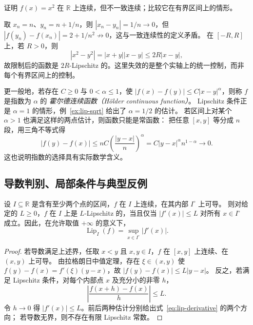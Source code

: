 \documentclass[UTF8,12pt,a4paper,fontset=fandol]{ctexart}
\begin{document}
\begin{example}\label{ex:lip-square-global}
证明 $f(x)=x^2$ 在 $\mathbb R$ 上连续，但不一致连续；比较它在有界区间上的情形。
\end{example}
\begin{solve}
取 $x_n=n$、$y_n=n+1/n$，则 $|x_n-y_n|=1/n\to0$，但
$|f(y_n)-f(x_n)|=2+1/n^2\not\to0$，这与一致连续性的定义矛盾。
在 $[-R,R]$ 上，若 $R>0$，则
\[
  |x^2-y^2|=|x+y||x-y|\le2R|x-y|,
\]
故限制后的函数是 $2R$-Lipschitz 的。这里失效的是整个实轴上的统一控制，而非每个有界区间上的控制。
\end{solve}

更一般地，若存在 $C\ge0$ 与 $0<\alpha\le1$，使
$|f(x)-f(y)|\le C|x-y|^\alpha$，则称 $f$ 是指数为 $\alpha$ 的
\emph{霍尔德连续函数（Hölder continuous function）}。
Lipschitz 条件正是 $\alpha=1$ 的情形，例~\ref{ex:lip-sqrt} 给出了 $\alpha=1/2$ 的估计。
若区间上对某个 $\alpha>1$ 也满足这样的两点估计，则函数只能是常函数：
把任意 $[x,y]$ 等分成 $n$ 段，用三角不等式得
\[
  |f(y)-f(x)|\le nC\left(\frac{|y-x|}{n}\right)^\alpha
  =C|y-x|^\alpha n^{1-\alpha}\longrightarrow0.
\]
这也说明指数的选择具有实际数学含义。

\subsection{导数判别、局部条件与典型反例}
\label{subsec:lip-derivative}

\begin{theorem}\label{thm:lip-derivative}
设 $I\subseteq\mathbb R$ 是含有至少两个点的区间，$f$ 在 $I$ 上连续，在其内部 $I^\circ$ 上可导。
则对给定的 $L\ge0$，$f$ 在 $I$ 上是 $L$-Lipschitz 的，当且仅当
$|f'(x)|\le L$ 对所有 $x\in I^\circ$ 成立。因此，在允许取值 $+\infty$ 的意义下，
\begin{equation}\label{eq:lip-derivative}
  \operatorname{Lip}_I(f)=\sup_{x\in I^\circ}|f'(x)|.
\end{equation}
\end{theorem}

\begin{proof}
若导数满足上述界，任取 $x<y$ 且 $x,y\in I$，$f$ 在 $[x,y]$ 上连续、在 $(x,y)$ 上可导。
由拉格朗日中值定理，存在 $\xi\in(x,y)$ 使
$f(y)-f(x)=f'(\xi)(y-x)$，故 $|f(y)-f(x)|\le L|y-x|$。
反之，若满足 Lipschitz 条件，对每个内部点 $x$ 及充分小的非零 $h$，
\[
  \left|\frac{f(x+h)-f(x)}{h}\right|\le L.
\]
令 $h\to0$ 得 $|f'(x)|\le L$。前后两种估计分别给出式~\eqref{eq:lip-derivative} 的两个方向；
若导数无界，则不存在有限 Lipschitz 常数。
\end{proof}
\end{document}

